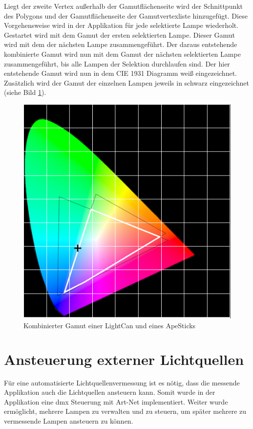 \documentclass[11pt]{scrartcl}
\begin{document}
\noindent
Liegt der zweite Vertex außerhalb der Gamutflächenseite wird der Schnittpunkt des Polygons und der Gamutflächenseite der Gamutvertexliste hinzugefügt.
Diese Vorgehensweise wird in der Applikation für jede selektierte Lampe wiederholt. Gestartet wird mit dem Gamut der ersten selektierten Lampe. Dieser
Gamut wird mit dem der nächsten Lampe zusammengeführt. Der daraus entstehende kombinierte Gamut wird nun mit dem Gamut der nächsten selektierten Lampe
zusammengeführt, bis alle Lampen der Selektion durchlaufen sind. Der hier entstehende Gamut wird nun in dem CIE 1931 Diagramm weiß eingezeichnet.
Zusätzlich wird der Gamut der einzelnen Lampen jeweils in schwarz eingezeichnet (siehe Bild \ref{fig:combinedGamut}).
\begin{figure}[H]
    \begin{center}
        \includegraphics[width=.9\textwidth]{images/combined_gamut_lightCan_lightStick.png}
    \end{center}
    \caption{Kombinierter Gamut einer LightCan und eines ApeSticks}\label{fig:combinedGamut}
\end{figure}
\noindent
\clearpage

\section{Ansteuerung externer Lichtquellen}
Für eine automatisierte Lichtquellenvermessung ist es nötig, dass die messende Applikation auch die Lichtquellen ansteuern kann. Somit wurde
in der Applikation eine \ac{dmx} Steuerung mit Art-Net implementiert. Weiter wurde ermöglicht, mehrere Lampen zu verwalten und zu steuern, um später mehrere
zu vermessende Lampen ansteuern zu können.
\end{document}
